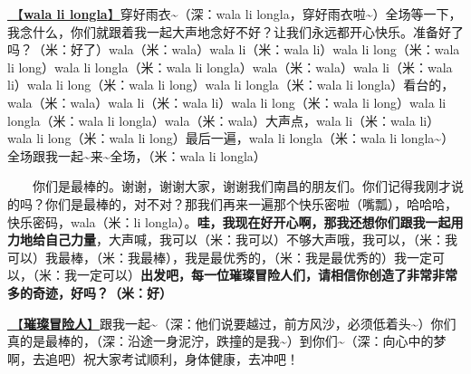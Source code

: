 \documentclass[]{ctexbook}
\begin{document}
\hyperref[wala-li-longla]{🎵【\textbf{wala li longla}】}穿好雨衣\textasciitilde（深：wala li longla，穿好雨衣啦\textasciitilde）全场等一下，我念什么，你们就跟着我一起大声地念好不好？让我们永远都开心快乐。准备好了吗？（米：好了）wala（米：wala）wala li（米：wala li）wala li long（米：wala li long）wala li longla（米：wala li longla）wala（米：wala）wala li（米：wala li）wala li long（米：wala li long）wala li longla（米：wala li longla）看台的，wala（米：wala）wala li（米：wala li）wala li long（米：wala li long）wala li longla（米：wala li longla）wala（米：wala）大声点，wala li（米：wala li）wala li long（米：wala li long）最后一遍，wala li longla（米：wala li longla\textasciitilde）全场跟我一起\textasciitilde 来\textasciitilde 全场，（米：wala li longla）

  你们是最棒的。谢谢，谢谢大家，谢谢我们南昌的朋友们。你们记得我刚才说的吗？你们是最棒的，对不对？那我们再来一遍那个快乐密啦（嘴瓢），哈哈哈，快乐密码，wala（米：li longla）。\textbf{哇，我现在好开心啊，那我还想你们跟我一起用力地给自己力量}，大声喊，我可以（米：我可以）不够大声哦，我可以，（米：我可以）我最棒，（米：我最棒），我是最优秀的，（米：我是最优秀的）我一定可以，（米：我一定可以）\textbf{出发吧，每一位璀璨冒险人们，请相信你创造了非常非常多的奇迹，好吗？（米：好）}

\hyperref[adventurers]{🎵【\textbf{璀璨冒险人}】}跟我一起\textasciitilde（深：他们说要越过，前方风沙，必须低着头\textasciitilde）你们真的是最棒的，（深：沿途一身泥泞，跌撞的是我\textasciitilde）到你们\textasciitilde（深：向心中的梦啊，去追吧）祝大家考试顺利，身体健康，去冲吧！
\end{document}
